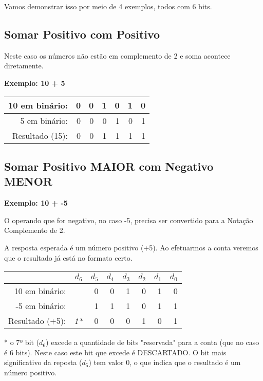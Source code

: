 Vamos demonstrar isso por meio de 4 exemplos, todos com 6 bits.

\subsection{Somar Positivo com Positivo}
Neste caso os números não estão em complemento de 2 e soma acontece diretamente.

\noindent\textbf{Exemplo: 10 + 5}
\begin{table}[h]
	\centering
	\begin{tabular}{|r|r|r|r|r|r|r|}
		\hline
		10 em binário: 	& 0 & 0 & 1  & 0 & 1 & 0 \\
		\hline
		5 em binário:	& 0 & 0 & 0  & 1 & 0 & 1 \\
		\hline
		\hline
		Resultado (15):		& 0	& 0 & 1  &1	 & 1 & 1 \\
		\hline
	\end{tabular}
\end{table}


\subsection{Somar Positivo MAIOR com Negativo MENOR}

\noindent\textbf{Exemplo: 10 + -5}

O operando que for negativo, no caso -5, precisa ser convertido para a Notação Complemento de 2. 

A resposta esperada é um número positivo (+5). Ao efetuarmos a conta veremos que o resultado já está no formato certo.


\begin{table}[h]
	\centering
	\begin{tabular}{|r|r|r|r|r|r|r|r|}
		\hline
						& $d_6$ & $d_5$ & $d_4$ & $d_3$  & $d_2$ & $d_1$ & $d_0$ \\
		\hline
		10 em binário: 	&	& 0 & 0 & 1  & 0 & 1 & 0 \\
		\hline
		-5 em binário:	&	& 1 & 1 & 1  & 0 & 1 & 1 \\
		\hline
		\hline
		Resultado (+5):	& \textit{1*}  & 0	& 0 & 0  & 1 & 0 & 1 \\
		\hline
	\end{tabular}
\end{table}
* o 7º bit ($d_6$) excede a quantidade de bits "reservada" para a conta (que no caso é 6 bits). Neste caso este bit que excede é DESCARTADO. O bit mais significativo da reposta ($d_5$) tem valor 0, o que indica que o resultado é um número positivo.


